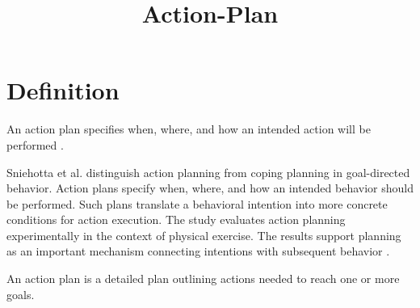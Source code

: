 \documentclass[a4paper]{article}
\title{Action-Plan}
\date{}
\begin{document}
   \maketitle
   \section{Definition}
      An action plan specifies when, where, and how an intended action will be
      performed \cite{sniehotta-2006-action-plans-and-coping-plans-for-physical-exercise-a-longitudinal-intervention-study-in-cardiac-rehabilitation}.

      Sniehotta et al. distinguish action planning from coping planning in goal-directed behavior. Action plans specify when, where, and how an intended behavior should be performed. Such plans translate a behavioral intention into more concrete conditions for action execution.
      The study evaluates action planning experimentally in the context of physical exercise. The results support planning as an important mechanism connecting intentions with subsequent behavior \cite{sniehotta-2006-action-plans-and-coping-plans-for-physical-exercise-a-longitudinal-intervention-study-in-cardiac-rehabilitation}.

      An action plan is a detailed plan outlining actions needed to reach one or more goals. 
\end{document}
